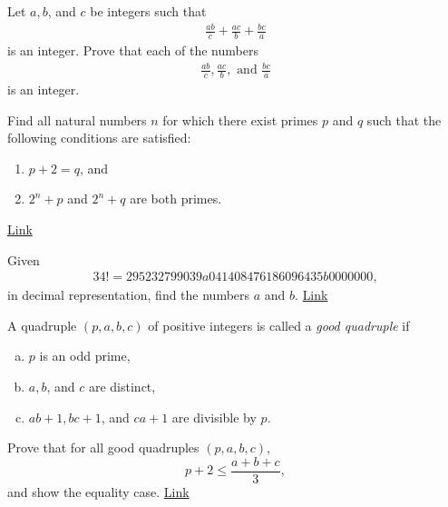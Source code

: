 


\begin{problem}
	Let $a,b$, and $c$ be integers such that
		\begin{align*}
			\frac{ab}{c} + \frac{ac}{b} + \frac{bc}{a}
		\end{align*}
	is an integer. Prove that each of the numbers
		\begin{align*}
			\frac{ab}{c} , \frac{ac}{b}, \text{ and } \frac{bc}{a}
		\end{align*}
	is an integer.
\end{problem}


\begin{problem} \label{azerbaijan2016}
	Find all natural numbers $n$ for which there exist primes $p$ and $q$ such that the following conditions are satisfied:
	\begin{enumerate}
		\item $p+2=q$, and
		\item $2^n+p$ and $2^n+q$ are both primes.
	\end{enumerate}
	\hfill \href{https://artofproblemsolving.com/community/c6h1323462p7131461}{Link}
\end{problem}


\begin{problem}
	Given  
	\begin{align*}
	34!=295232799039a041408476186096435b0000000,
	\end{align*}
	in decimal representation, find the numbers $a$ and $b$. \hfill \href{http://artofproblemsolving.com/community/c6h1195518p5852632}{Link}
\end{problem}


\begin{problem}
	A quadruple $(p,a,b,c)$ of positive integers is called a \textit{good quadruple} if 
	\begin{enumerate}[(a)]
		\item $p $ is an odd prime,
		\item $a,b$, and $c $ are distinct,
		\item $ab+1,bc+1$, and $ca+1$ are divisible by $p$.
	\end{enumerate}
	Prove that for all good quadruples $(p,a,b,c)$, \[p+2\le \frac {a+b+c}{3} ,\] and show the equality case. \flushright \href{http://artofproblemsolving.com/community/c6h1195523p5852672}{Link}
\end{problem}


